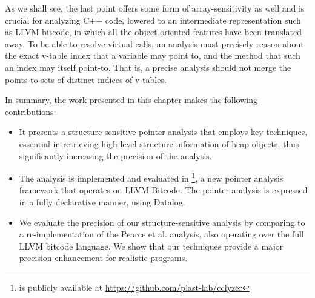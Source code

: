 \noindent
As we shall see, the last point offers some form of array-sensitivity
as well and is crucial for analyzing C++ code, lowered to an
intermediate representation such as LLVM bitcode, in which all the
object-oriented features have been translated away. To be able to
resolve virtual calls, an analysis must precisely reason about the
exact v-table index that a variable may point to, and the method that
such an index may itself point-to. That is, a precise analysis should
not merge the points-to sets of distinct indices of v-tables.


In summary, the work presented in this chapter makes the following
contributions:
\begin{itemize}
\setlength\itemsep{0.5em}
\item It presents a structure-sensitive pointer analysis that employs
  key techniques, essential in retrieving high-level structure
  information of heap objects, thus significantly increasing the
  precision of the analysis.
\item The analysis is implemented and evaluated in
  \cclyzer{}\footnote{\cclyzer{} is publicly available at
    \url{https://github.com/plast-lab/cclyzer}}, a new pointer
  analysis framework that operates on LLVM Bitcode. The pointer
  analysis is expressed in a fully declarative manner, using Datalog.
\item We evaluate the precision of our structure-sensitive analysis by
  comparing to a re-implementation of the Pearce et
  al. \cite{paste/PearceKH04,toplas/PearceKH07} analysis, also operating over the full
  LLVM bitcode language. We show that our techniques provide a major
  precision enhancement for realistic programs. 
\end{itemize}



